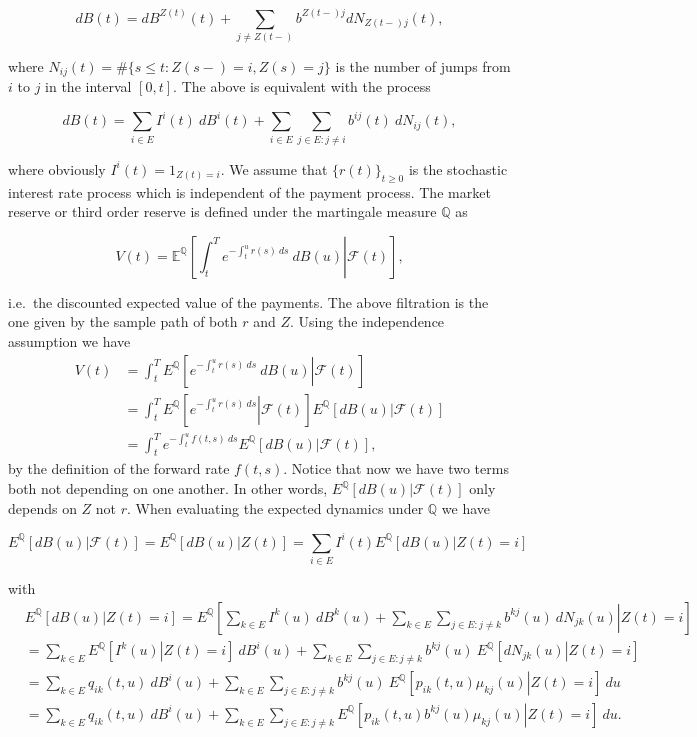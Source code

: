 \documentclass[
]{book}
\begin{document}
\[
dB(t)=dB^{Z(t)}(t)+\sum_{j\ne Z(t-)}b^{Z(t-)j}dN_{Z(t-)j}(t),
\]

where \(N_{ij}(t)=\#\{s\le t:Z(s-)=i,Z(s)=j\}\) is the number of jumps from \(i\) to \(j\)
in the interval \([0,t]\). The above is equivalent with the process

\[
dB(t)=\sum_{i\in E}I^i(t)\ dB^i(t)+\sum_{i\in E}\sum_{j\in E : j\ne i}b^{ij}(t)\ dN_{ij}(t),
\]

where obviously \(I^i(t)=1_{Z(t)=i}\). We assume that \(\{r(t)\}_{t\ge 0}\) is the stochastic interest rate process which is independent of the payment process. The market reserve or third order reserve is defined under the martingale measure \(\mathbb Q\) as

\[
V(t)=\mathbb E^{\mathbb Q}\left[\left.\int_t^Te^{-\int_t^ur(s)\ ds}\ dB(u)\right\vert \mathcal F(t)\right],
\]

i.e.~the discounted expected value of the payments. The above filtration is the one given by the sample path of both \(r\) and \(Z\). Using the independence assumption we have
\begin{align*}
V(t)&=\int_t^TE^{\mathbb Q}\left[\left.e^{-\int_t^ur(s)\ ds}\ dB(u)\right\vert \mathcal F(t)\right]\\
&=\int_t^TE^{\mathbb Q}\left[\left.e^{-\int_t^ur(s)\ ds}\right\vert \mathcal F(t)\right]E^{\mathbb Q}\left[\left.dB(u)\right\vert \mathcal F(t)\right]\\
&=\int_t^Te^{-\int_t^uf(t,s)\ ds}E^{\mathbb Q}\left[\left.dB(u)\right\vert \mathcal F(t)\right],
\end{align*}
by the definition of the forward rate \(f(t,s)\). Notice that now we have two terms both not depending on one another. In other words, \(E^{\mathbb Q}\left[\left.dB(u)\right\vert \mathcal F(t)\right]\) only depends on \(Z\) not \(r\). When evaluating the expected dynamics under \(\mathbb Q\) we have

\[
E^{\mathbb Q}\left[\left.dB(u)\right\vert \mathcal F(t)\right]=E^{\mathbb Q}\left[\left.dB(u)\right\vert Z(t)\right]=\sum_{i\in E}I^i(t)E^{\mathbb Q}\left[\left.dB(u)\right\vert Z(t)=i\right]
\]

with
\begin{align*}
&E^{\mathbb Q}\left[\left.dB(u)\right\vert Z(t)=i\right]=E^{\mathbb Q}\left[\left.\sum_{k\in E}I^k(u)\ dB^k(u)+\sum_{k\in E}\sum_{j\in E : j\ne k}b^{kj}(u)\ dN_{jk}(u)\right\vert Z(t)=i\right]\\
&=\sum_{k\in E}E^{\mathbb Q}\left[\left.I^k(u)\right\vert Z(t)=i\right]\ dB^i(u)+\sum_{k\in E}\sum_{j\in E : j\ne k}b^{kj}(u)\ E^{\mathbb Q}\left[\left.dN_{jk}(u)\right\vert Z(t)=i\right]\\
&=\sum_{k\in E}q_{ik}(t,u)\ dB^i(u)+\sum_{k\in E}\sum_{j\in E : j\ne k}b^{kj}(u)\ E^{\mathbb Q}\left[\left.p_{ik}(t,u)\mu_{kj}(u)\right\vert Z(t)=i\right]\ du\\
&=\sum_{k\in E}q_{ik}(t,u)\ dB^i(u)+\sum_{k\in E}\sum_{j\in E : j\ne k}E^{\mathbb Q}\left[\left.p_{ik}(t,u)b^{kj}(u)\mu_{kj}(u)\right\vert Z(t)=i\right]\ du.
\end{align*}
\end{document}
